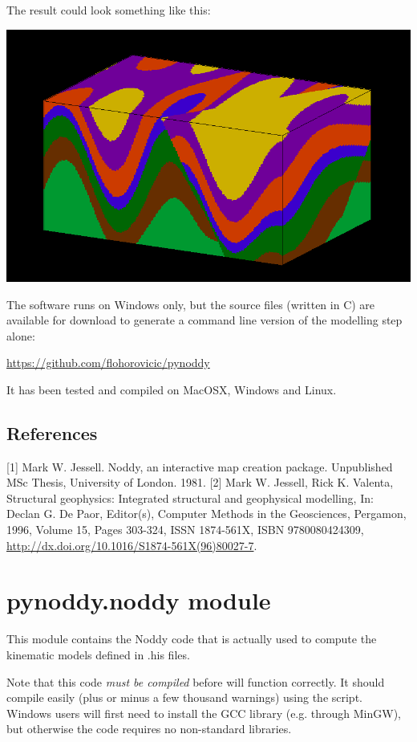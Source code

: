 \documentclass[a4paper,10pt,english]{sphinxmanual}
\begin{document}
The result could look something like this:

\includegraphics{noddy_block_example.png}

The software runs on Windows only, but the source files (written in C)
are available for download to generate a command line version of the
modelling step alone:

\href{https://github.com/flohorovicic/pynoddy}{https://github.com/flohorovicic/pynoddy}

It has been tested and compiled on MacOSX, Windows and Linux.


\section{References}
\label{readme:references}
{[}1{]} Mark W. Jessell. Noddy, an interactive map creation package.
Unpublished MSc Thesis, University of London. 1981. {[}2{]} Mark W. Jessell,
Rick K. Valenta, Structural geophysics: Integrated structural and
geophysical modelling, In: Declan G. De Paor, Editor(s), Computer
Methods in the Geosciences, Pergamon, 1996, Volume 15, Pages 303-324,
ISSN 1874-561X, ISBN 9780080424309,
\href{http://dx.doi.org/10.1016/S1874-561X(96)80027-7}{http://dx.doi.org/10.1016/S1874-561X(96)80027-7}.


\chapter{pynoddy.noddy module}
\label{noddy_module::doc}\label{noddy_module:pynoddy-noddy-module}
This module contains the Noddy code that is actually used to compute the kinematic models
defined in .his files.

Note that this code \emph{must be compiled} before 
will function correctly. It should compile easily (plus or minus a few thousand
warnings) using the  script. Windows users will first need to install the GCC
library (e.g. through MinGW), but otherwise the code requires no non-standard libraries.
\end{document}
